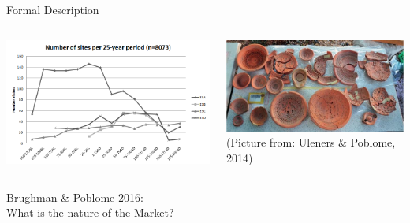 \documentclass[12pt, notes=show]{beamer}
\begin{document}
\begin{frame}{Formal Description}
    \begin{columns}
	\begin{column}{.6\textwidth}
	    \begin{center}
		\includegraphics[width=\textwidth]{images/wareRome.png} 
	    \end{center}
	\end{column}
	\begin{column}{.45\textwidth}
		\includegraphics[width=.7\textwidth]{images/romantableware.jpeg} \\
		{\tiny (Picture from: Uleners \& Poblome, 2014)}
	\end{column}
    \end{columns}
    \vspace{.8cm}
	Brughman \& Poblome 2016: \\
	What is the nature of the Market?

\end{frame}
\end{document}
